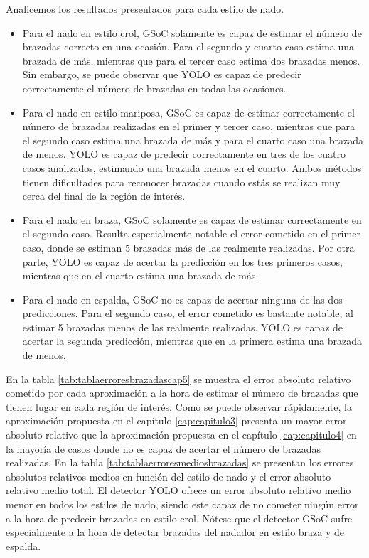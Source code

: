 Analicemos los resultados presentados para cada estilo de nado. 
\begin{itemize}
    \item Para el nado en estilo crol, GSoC solamente es capaz de estimar el número de brazadas correcto en una ocasión. Para el segundo y cuarto caso estima una brazada de más, mientras que para el tercer caso estima dos brazadas menos. Sin embargo, se puede observar que YOLO es capaz de predecir correctamente el número de brazadas en todas las ocasiones.
    
    \item Para el nado en estilo mariposa, GSoC es capaz de estimar correctamente el número de brazadas realizadas en el primer y tercer caso, mientras que para el segundo caso estima una brazada de más y para el cuarto caso una brazada de menos. YOLO es capaz de predecir correctamente en tres de los cuatro casos analizados, estimando una brazada menos en el cuarto. Ambos métodos tienen dificultades para reconocer brazadas cuando estás se realizan muy cerca del final de la región de interés.
    
    \item Para el nado en braza, GSoC solamente es capaz de estimar correctamente en el segundo caso. Resulta especialmente notable el error cometido en el primer caso, donde se estiman 5 brazadas más de las realmente realizadas. Por otra parte, YOLO es capaz de acertar la predicción en los tres primeros casos, mientras que en el cuarto estima una brazada de más.
    
    \item Para el nado en espalda, GSoC no es capaz de acertar ninguna de las dos predicciones. Para el segundo caso, el error cometido es bastante notable, al estimar 5 brazadas menos de las realmente realizadas. YOLO es capaz de acertar la segunda predicción, mientras que en la primera estima una brazada de menos.
\end{itemize}

En la tabla \ref{tab:tablaerroresbrazadascap5} se muestra el error absoluto relativo cometido por cada aproximación a la hora de estimar el número de brazadas que tienen lugar en cada región de interés. Como se puede observar rápidamente, la aproximación propuesta en el capítulo \ref{cap:capitulo3} presenta un mayor error absoluto relativo que la aproximación propuesta en el capítulo \ref{cap:capitulo4} en la mayoría de casos donde no es capaz de acertar el número de brazadas realizadas. En la tabla \ref{tab:tablaerroresmediosbrazadas} se presentan los errores absolutos relativos medios en función del estilo de nado y el error absoluto relativo medio total. El detector YOLO ofrece un error absoluto relativo medio menor en todos los estilos de nado, siendo este capaz de no cometer ningún error a la hora de predecir brazadas en estilo crol. Nótese que el detector GSoC sufre especialmente a la hora de detectar brazadas del nadador en estilo braza y de espalda. 

